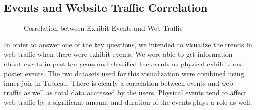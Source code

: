 \subsection{Events and Website Traffic Correlation} \label{vizevents}

\begin{figure}
\centering
{}
\caption{Correlation between Exhibit Events and Web Traffic}
\label{fig:EventTraffic}
\end{figure}

In order to answer one of the key questions, we intended to visualize the trends in web traffic when there were exhibit events. We were able to get information about events in past ten years and classified the events as physical exhibits and poster events. The two datasets used for this visualization were combined using inner join in Tableau. There is clearly a correlation between events and web traffic as well as total data acccessed by the users. Physical events tend to affect web traffic by a significant amount and duration of the events plays a role as well.
